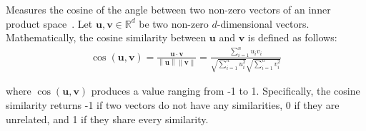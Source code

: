 \begin{definition}
  Measures the cosine of the angle between two non-zero vectors of an inner
  product space~\citep{website:deepai:cosine:similarity}. Let $\mathbf{u},
  \mathbf{v} \in \mathbb{R}^d$ be two non-zero $d$-dimensional vectors.
  Mathematically, the cosine similarity between $\mathbf{u}$ and $\mathbf{v}$ is
  defined as follows:
  \begin{align}
    \cos(\mathbf{u}, \mathbf{v}) =
    \frac{\mathbf{u} \cdot \mathbf{v}}
    {\left\lVert \mathbf{u} \right\rVert
    \left\lVert \mathbf{v} \right\rVert} =
    \frac{\sum\limits_{i = 1}^n u_i v_i}
    {\sqrt{\sum\limits_{i = 1}^n u_i^2}
    \sqrt{\sum\limits_{i = 1}^n v_i^2}}
    \label{eq:cosine:similarity}
  \end{align}

  where $\cos(\mathbf{u}, \mathbf{v})$ produces a value ranging from -1 to 1.
  Specifically, the cosine similarity returns -1 if two vectors do not have any
  similarities, 0 if they are unrelated, and 1 if they share every similarity.
  \label{def:cosine:similarity}
\end{definition}

